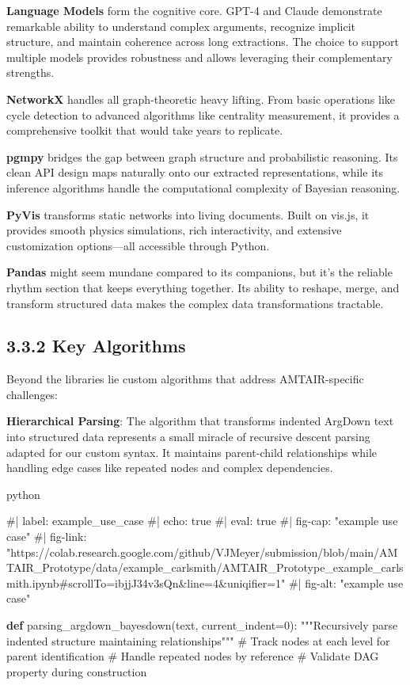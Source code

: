 \documentclass[
  11pt,
  letterpaper,
  openany]{book}
\newenvironment{Shaded}{\begin{snugshade}}{\end{snugshade}}
\newcommand{\CommentTok}[1]{\textcolor[rgb]{0.37,0.37,0.37}{#1}}
\newcommand{\DecValTok}[1]{\textcolor[rgb]{0.68,0.00,0.00}{#1}}
\newcommand{\KeywordTok}[1]{\textcolor[rgb]{0.00,0.23,0.31}{\textbf{#1}}}
\newcommand{\NormalTok}[1]{\textcolor[rgb]{0.00,0.23,0.31}{#1}}
\newcommand{\OperatorTok}[1]{\textcolor[rgb]{0.37,0.37,0.37}{#1}}
\begin{document}
\textbf{Language Models} form the cognitive core. GPT-4 and Claude
demonstrate remarkable ability to understand complex arguments,
recognize implicit structure, and maintain coherence across long
extractions. The choice to support multiple models provides robustness
and allows leveraging their complementary strengths.

\textbf{NetworkX} handles all graph-theoretic heavy lifting. From basic
operations like cycle detection to advanced algorithms like centrality
measurement, it provides a comprehensive toolkit that would take years
to replicate.

\textbf{pgmpy} bridges the gap between graph structure and probabilistic
reasoning. Its clean API design maps naturally onto our extracted
representations, while its inference algorithms handle the computational
complexity of Bayesian reasoning.

\textbf{PyVis} transforms static networks into living documents. Built
on vis.js, it provides smooth physics simulations, rich interactivity,
and extensive customization options---all accessible through Python.

\textbf{Pandas} might seem mundane compared to its companions, but it's
the reliable rhythm section that keeps everything together. Its ability
to reshape, merge, and transform structured data makes the complex data
transformations tractable.

\subsection{3.3.2 Key Algorithms}\label{sec-key-algorithms}

Beyond the libraries lie custom algorithms that address AMTAIR-specific
challenges:

\textbf{Hierarchical Parsing}: The algorithm that transforms indented
ArgDown text into structured data represents a small miracle of
recursive descent parsing adapted for our custom syntax. It maintains
parent-child relationships while handling edge cases like repeated nodes
and complex dependencies.

python

\begin{Shaded}
\begin{Highlighting}[]
\CommentTok{\#| label: example\_use\_case}
\CommentTok{\#| echo: true}
\CommentTok{\#| eval: true}
\CommentTok{\#| fig{-}cap: "example use case"}
\CommentTok{\#| fig{-}link: "https://colab.research.google.com/github/VJMeyer/submission/blob/main/AMTAIR\_Prototype/data/example\_carlsmith/AMTAIR\_Prototype\_example\_carlsmith.ipynb\#scrollTo=ibjjJ34v3sQn\&line=4\&uniqifier=1"}
\CommentTok{\#| fig{-}alt: "example use case"}

\KeywordTok{def}\NormalTok{ parsing\_argdown\_bayesdown(text, current\_indent}\OperatorTok{=}\DecValTok{0}\NormalTok{):}
    \CommentTok{"""Recursively parse indented structure maintaining relationships"""}
    \CommentTok{\# Track nodes at each level for parent identification}
    \CommentTok{\# Handle repeated nodes by reference}
    \CommentTok{\# Validate DAG property during construction}
\end{Highlighting}
\end{Shaded}
\end{document}
